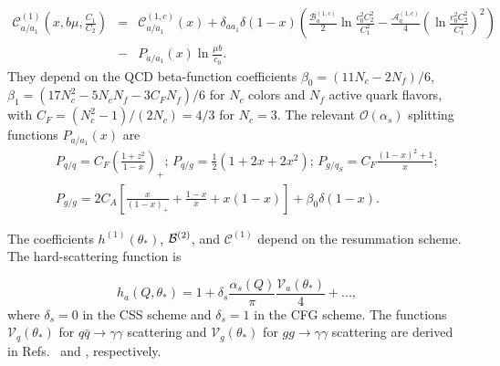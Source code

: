 \documentclass[12pt,english,aps,preprint,prd,letterpaper,fleqn,nofootinbib,showpacs,showkeys,tightenlines,floatfix]{revtex4}
\begin{document}
{\begin{eqnarray}
\mathcal{C}_{a/a_{1}}^{(1)}(x,b\mu,\frac{C_{1}}{C_{2}}) & = & \mathcal{C}_{a/a_{1}}^{(1,c)}(x)+\delta_{aa_{1}}\delta(1-x)\left(\frac{\mathcal{B}_{a}^{(1,c)}}{2}\ln\frac{c_{0}^{2}C_{2}^{2}}{C_{1}^{2}}-\frac{\mathcal{A}_{a}^{(1,c)}}{4}\left(\ln\frac{c_{0}^{2}C_{2}^{2}}{C_{1}^{2}}\right)^{2}\right)\nonumber \\
 & - & P_{a/a_{1}}(x)\ln\frac{\mu b}{c_{0}}.\end{eqnarray}
 They depend on the QCD beta-function coefficients $\beta_{0}=(11N_{c}-2N_{f})/6$,
$\beta_{1}=(17N_{c}^{2}-5N_{c}N_{f}-3C_{F}N_{f})/6$ for $N_{c}$
colors and $N_{f}$ active quark flavors, with $C_{F}=(N_{c}^{2}-1)/(2N_{c})=4/3$
for $N_{c}=3$. The relevant ${\mathcal{O}}(\alpha_{s})$ splitting
functions $P_{a/a_{1}}(x)$ are\begin{eqnarray}
 &  & P_{q/q}=C_{F}\left(\frac{1+z^{2}}{1-x}\right)_{+};\, P_{q/g}=\frac{1}{2}(1+2x+2x^{2});\, P_{g/q_{S}}=C_{F}\frac{(1-x)^{2}+1}{x};\\
 &  & P_{g/g}=2C_{A}\left[\frac{x}{(1-x)_{+}}+\frac{1-x}{x}+x(1-x)\right]+\beta_{0}\delta(1-x).\end{eqnarray}


The coefficients $h^{(1)}(\theta_{*})$, ${\cal B}^{(2)}$, and
$\mathcal{C}^{(1)}$ depend on the resummation scheme. The hard-scattering
function is

\begin{equation}
h_{a}(Q,\theta_{*})=1+\delta_{s}\frac{\alpha_{s}(Q)}{\pi}\frac{\mathcal{V}_{a}(\theta_{*})}{4}+...,\end{equation}
 where $\delta_{s}=0$ in the CSS scheme and $\delta_{s}=1$ in the
CFG scheme. The functions $\mathcal{V}_{q}(\theta_{*})$ for $q\bar{q}\rightarrow\gamma\gamma$
scattering and $\mathcal{V}_{g}(\theta_{*})$ for $gg\rightarrow\gamma\gamma$
scattering are derived in Refs.~\cite{Balazs:1997hv} and \cite{Nadolsky:2002gj},
respectively.

}
\end{document}
